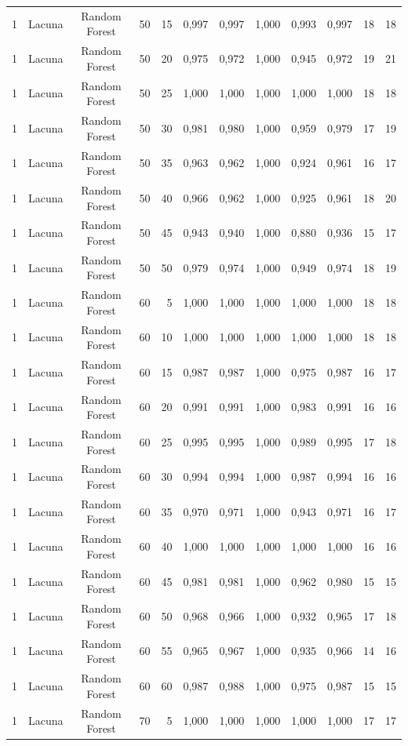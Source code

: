\begin{longtable}{ccclrrrrrrrr}
1 & Lacuna & Random Forest & 50 & 15 & 0,997 & 0,997 & 1,000 & 0,993 & 0,997 & 18 & 18 \\
1 & Lacuna & Random Forest & 50 & 20 & 0,975 & 0,972 & 1,000 & 0,945 & 0,972 & 19 & 21 \\
1 & Lacuna & Random Forest & 50 & 25 & 1,000 & 1,000 & 1,000 & 1,000 & 1,000 & 18 & 18 \\
1 & Lacuna & Random Forest & 50 & 30 & 0,981 & 0,980 & 1,000 & 0,959 & 0,979 & 17 & 19 \\
1 & Lacuna & Random Forest & 50 & 35 & 0,963 & 0,962 & 1,000 & 0,924 & 0,961 & 16 & 17 \\
1 & Lacuna & Random Forest & 50 & 40 & 0,966 & 0,962 & 1,000 & 0,925 & 0,961 & 18 & 20 \\
1 & Lacuna & Random Forest & 50 & 45 & 0,943 & 0,940 & 1,000 & 0,880 & 0,936 & 15 & 17 \\
1 & Lacuna & Random Forest & 50 & 50 & 0,979 & 0,974 & 1,000 & 0,949 & 0,974 & 18 & 19 \\
1 & Lacuna & Random Forest & 60 & 5 & 1,000 & 1,000 & 1,000 & 1,000 & 1,000 & 18 & 18 \\
1 & Lacuna & Random Forest & 60 & 10 & 1,000 & 1,000 & 1,000 & 1,000 & 1,000 & 18 & 18 \\
1 & Lacuna & Random Forest & 60 & 15 & 0,987 & 0,987 & 1,000 & 0,975 & 0,987 & 16 & 17 \\
1 & Lacuna & Random Forest & 60 & 20 & 0,991 & 0,991 & 1,000 & 0,983 & 0,991 & 16 & 16 \\
1 & Lacuna & Random Forest & 60 & 25 & 0,995 & 0,995 & 1,000 & 0,989 & 0,995 & 17 & 18 \\
1 & Lacuna & Random Forest & 60 & 30 & 0,994 & 0,994 & 1,000 & 0,987 & 0,994 & 16 & 16 \\
1 & Lacuna & Random Forest & 60 & 35 & 0,970 & 0,971 & 1,000 & 0,943 & 0,971 & 16 & 17 \\
1 & Lacuna & Random Forest & 60 & 40 & 1,000 & 1,000 & 1,000 & 1,000 & 1,000 & 16 & 16 \\
1 & Lacuna & Random Forest & 60 & 45 & 0,981 & 0,981 & 1,000 & 0,962 & 0,980 & 15 & 15 \\
1 & Lacuna & Random Forest & 60 & 50 & 0,968 & 0,966 & 1,000 & 0,932 & 0,965 & 17 & 18 \\
1 & Lacuna & Random Forest & 60 & 55 & 0,965 & 0,967 & 1,000 & 0,935 & 0,966 & 14 & 16 \\
1 & Lacuna & Random Forest & 60 & 60 & 0,987 & 0,988 & 1,000 & 0,975 & 0,987 & 15 & 15 \\
1 & Lacuna & Random Forest & 70 & 5 & 1,000 & 1,000 & 1,000 & 1,000 & 1,000 & 17 & 17 \\

\end{longtable}
